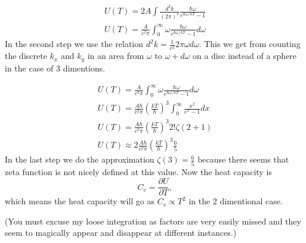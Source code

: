 \documentclass[twocolumn]{article}[10pt]
\begin{document}
\begin{align*}
U(T) = 2A\int \frac{d^2k}{(2\pi)^2} \frac{\hbar\omega}{e^{\hbar\omega/kT}-1}\\
U(T) = \frac{A}{c^2\pi}\int_0^\infty \omega \frac{\hbar\omega}{e^{\hbar\omega/kT}-1}d\omega
\end{align*}
In the second step we use the relation $d^2k = \frac{1}{c^2}2\pi\omega d\omega$. 
This we get from counting the discrete $k_x$ and $k_y$ in an area from 
$\omega$ to $\omega + d\omega$ on a disc 
instead of a sphere in the case of 3 dimentions. 

\begin{align*}
U(T) = \frac{A}{c^2\pi}\int_0^\infty \omega \frac{\hbar\omega}{e^{\hbar\omega/kT}-1}d\omega\\
U(T) = \frac{A\hbar}{c^2\pi}\left(\frac{kT}{\hbar}\right)^3
	\int_0^\infty \frac{x^2}{e^{x}-1}dx\\
U(T) = \frac{A\hbar}{c^2\pi}\left(\frac{kT}{\hbar}\right)^3
	2!\zeta(2+1)\\
U(T) \approx 2\frac{A\hbar}{c^2\pi}\left(\frac{kT}{\hbar}\right)^3
	\frac65
\end{align*}
In the last step we do the approximation $\zeta(3) = \frac65$ because 
there seems that zeta function is not nicely defined at this value. 
Now the heat capacity is $$C_v = \frac{\partial U}{\partial T},$$ which means
the heat capacity will go as $C_v\propto T^2$ in the 2 dimentional case. 

\newpage
(You must excuse my loose integration as factors are
very easily missed and they seem to magically appear and disappear
at different instances.)
\end{document}
